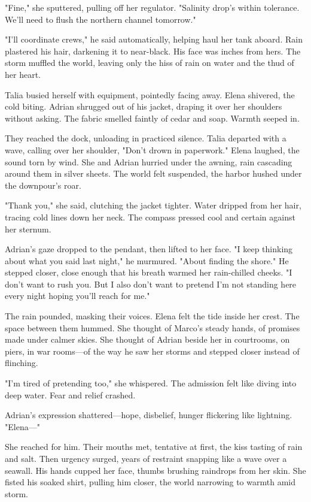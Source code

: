 "Fine," she sputtered, pulling off her regulator. "Salinity drop's within tolerance. We'll need to flush the northern channel tomorrow."

"I'll coordinate crews," he said automatically, helping haul her tank aboard. Rain plastered his hair, darkening it to near-black. His face was inches from hers. The storm muffled the world, leaving only the hiss of rain on water and the thud of her heart.

Talia busied herself with equipment, pointedly facing away. Elena shivered, the cold biting. Adrian shrugged out of his jacket, draping it over her shoulders without asking. The fabric smelled faintly of cedar and soap. Warmth seeped in.

They reached the dock, unloading in practiced silence. Talia departed with a wave, calling over her shoulder, "Don't drown in paperwork." Elena laughed, the sound torn by wind. She and Adrian hurried under the awning, rain cascading around them in silver sheets. The world felt suspended, the harbor hushed under the downpour's roar.

"Thank you," she said, clutching the jacket tighter. Water dripped from her hair, tracing cold lines down her neck. The compass pressed cool and certain against her sternum.

Adrian's gaze dropped to the pendant, then lifted to her face. "I keep thinking about what you said last night," he murmured. "About finding the shore." He stepped closer, close enough that his breath warmed her rain-chilled cheeks. "I don't want to rush you. But I also don't want to pretend I'm not standing here every night hoping you'll reach for me."

The rain pounded, masking their voices. Elena felt the tide inside her crest. The space between them hummed. She thought of Marco's steady hands, of promises made under calmer skies. She thought of Adrian beside her in courtrooms, on piers, in war rooms—of the way he saw her storms and stepped closer instead of flinching.

"I'm tired of pretending too," she whispered. The admission felt like diving into deep water. Fear and relief crashed.

Adrian's expression shattered—hope, disbelief, hunger flickering like lightning. "Elena—"

She reached for him. Their mouths met, tentative at first, the kiss tasting of rain and salt. Then urgency surged, years of restraint snapping like a wave over a seawall. His hands cupped her face, thumbs brushing raindrops from her skin. She fisted his soaked shirt, pulling him closer, the world narrowing to warmth amid storm.

